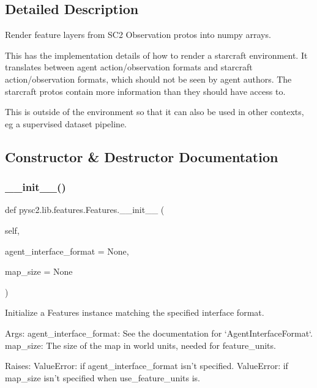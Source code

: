 \subsection{Detailed Description}
\begin{DoxyVerb}Render feature layers from SC2 Observation protos into numpy arrays.

This has the implementation details of how to render a starcraft environment.
It translates between agent action/observation formats and starcraft
action/observation formats, which should not be seen by agent authors. The
starcraft protos contain more information than they should have access to.

This is outside of the environment so that it can also be used in other
contexts, eg a supervised dataset pipeline.
\end{DoxyVerb}
 

\subsection{Constructor \& Destructor Documentation}
\mbox{\label{classpysc2_1_1lib_1_1features_1_1_features_af12dfcaae0adbc89c662a44b8ce762de}} 
\subsubsection{\texorpdfstring{\+\_\+\+\_\+init\+\_\+\+\_\+()}{\_\_init\_\_()}}
{\footnotesize\ttfamily def pysc2.\+lib.\+features.\+Features.\+\_\+\+\_\+init\+\_\+\+\_\+ (\begin{DoxyParamCaption}\item[{}]{self,  }\item[{}]{agent\+\_\+interface\+\_\+format = {\ttfamily None},  }\item[{}]{map\+\_\+size = {\ttfamily None} }\end{DoxyParamCaption})}

\begin{DoxyVerb}Initialize a Features instance matching the specified interface format.

Args:
  agent_interface_format: See the documentation for `AgentInterfaceFormat`.
  map_size: The size of the map in world units, needed for feature_units.

Raises:
  ValueError: if agent_interface_format isn't specified.
  ValueError: if map_size isn't specified when use_feature_units is.
\end{DoxyVerb}
 

